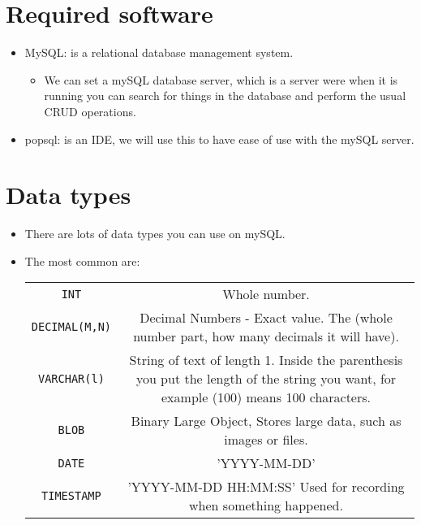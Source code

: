 \section{Required software}
\begin{itemize}
    \item MySQL: is a relational database management system.
        \begin{itemize}
            \item We can set a mySQL database server, which is a server were when it is running you can search for things in the database and perform the usual CRUD operations.
        \end{itemize}

    \item popsql: is an IDE, we will use this to have ease of use with the mySQL server.
\end{itemize}

\section{Data types}
\begin{itemize}
    \item There are lots of data types you can use on mySQL.
    \item The most common are:
        \begin{center}
            \begin{tabular}{ |c|c| }
                \hline
                    \texttt{INT} & Whole number. \\
                    \texttt{DECIMAL(M,N)} & Decimal Numbers - Exact value. The (whole number part, how many decimals it will have). \\
                    \texttt{VARCHAR(l)} & String of text of length 1. Inside the parenthesis you put the length of the string you want, for example (100) means 100 characters. \\
                    \texttt{BLOB} & Binary Large Object, Stores large data, such as images or files. \\
                    \texttt{DATE} & 'YYYY-MM-DD' \\
                    \texttt{TIMESTAMP} & 'YYYY-MM-DD HH:MM:SS' Used for recording when something happened. \\
                \hline
            \end{tabular}
        \end{center}
\end{itemize}

